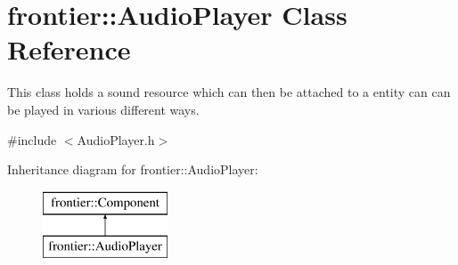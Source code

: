 \hypertarget{classfrontier_1_1_audio_player}{}\section{frontier\+:\+:Audio\+Player Class Reference}
\label{classfrontier_1_1_audio_player}


This class holds a sound resource which can then be attached to a entity can can be played in various different ways.  




{\ttfamily \#include $<$Audio\+Player.\+h$>$}

Inheritance diagram for frontier\+:\+:Audio\+Player\+:\begin{figure}[H]
\begin{center}
\leavevmode
\includegraphics[height=2.000000cm]{classfrontier_1_1_audio_player}
\end{center}
\end{figure}
